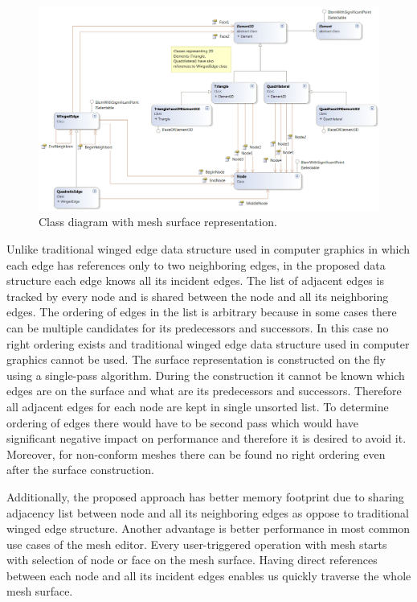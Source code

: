 \begin{figure}[H]
\centering
\includegraphics[width=\textwidth]{figures/chapter-mesh-visualization/figure3}
\decoRule
\caption[Class diagram of surface representation.]{Class diagram with mesh surface representation.}
\label{fig:class-diagram-surface}
\end{figure}

Unlike traditional winged edge data structure used in computer graphics in which each edge has references only to two neighboring edges, in the proposed data structure each edge knows all its incident edges. The list of adjacent edges is tracked by every node and is shared between the node and all its neighboring edges. The ordering of edges in the list is arbitrary because in some cases there can be multiple candidates for its predecessors and successors. In this case no right ordering exists and traditional winged edge data structure used in computer graphics cannot be used. The surface representation is constructed on the fly using a single-pass algorithm. During the construction it cannot be known which edges are on the surface and what are its predecessors and successors. Therefore all adjacent edges for each node are kept in single unsorted list. To determine ordering of edges there would have to be second pass which would have significant negative impact on performance and therefore it is desired to avoid it. Moreover, for non-conform meshes there can be found no right ordering even after the surface construction.

Additionally, the proposed approach has better memory footprint due to sharing adjacency list between node and all its neighboring edges as oppose to traditional winged edge structure. Another advantage is better performance in most common use cases of the mesh editor. Every user-triggered operation with mesh starts with selection of node or face on the mesh surface. Having direct references between each node and all its incident edges enables us quickly traverse the whole mesh surface.

